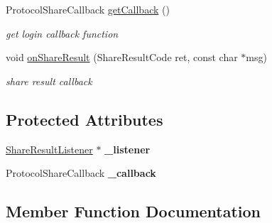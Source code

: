 \begin{DoxyCompactItemize}
\mbox{\label{classcocos2d_1_1plugin_1_1ProtocolShare_a97f2ceac612f20af50bc024ee477694e}} 
Protocol\+Share\+Callback \hyperlink{classcocos2d_1_1plugin_1_1ProtocolShare_a97f2ceac612f20af50bc024ee477694e}{get\+Callback} ()
\begin{DoxyCompactList}\small\item\em get login callback function \end{DoxyCompactList}\item 
\mbox{\label{classcocos2d_1_1plugin_1_1ProtocolShare_a2b5beb8e3924bee9a187fd57fd82172c}} 
void \hyperlink{classcocos2d_1_1plugin_1_1ProtocolShare_a2b5beb8e3924bee9a187fd57fd82172c}{on\+Share\+Result} (Share\+Result\+Code ret, const char $\ast$msg)
\begin{DoxyCompactList}\small\item\em share result callback \end{DoxyCompactList}\end{DoxyCompactItemize}
\subsection*{Protected Attributes}
\begin{DoxyCompactItemize}
\item 
\mbox{\label{classcocos2d_1_1plugin_1_1ProtocolShare_a5c1a41f764e7ce8b5349016d0801cdbb}} 
\hyperlink{classcocos2d_1_1plugin_1_1ShareResultListener}{Share\+Result\+Listener} $\ast$ {\bfseries \+\_\+listener}
\item 
\mbox{\label{classcocos2d_1_1plugin_1_1ProtocolShare_a95c298b6c9e881366a7339bd76ddbe19}} 
Protocol\+Share\+Callback {\bfseries \+\_\+callback}
\end{DoxyCompactItemize}


\subsection{Member Function Documentation}
\mbox{\label{classcocos2d_1_1plugin_1_1ProtocolShare_a505828f74fcd6f349ddb9a46cc5b381a}} 
